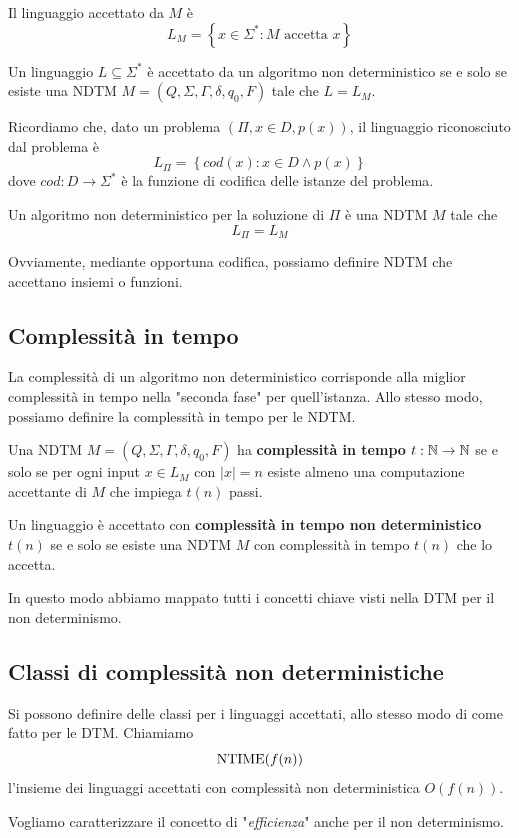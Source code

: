 Il linguaggio accettato da $M$ è 
$$ L_M = \left\{x \in \Sigma^\ast: M \text{ accetta } x\right\} $$

Un linguaggio $L \subseteq \Sigma^\ast$ è accettato da un algoritmo non deterministico se e solo se esiste una NDTM $M = (Q, \Sigma, \Gamma, \delta, q_0, F)$ tale che $L = L_M$.

Ricordiamo che, dato un problema $(\Pi, x \in D, p(x))$, il linguaggio riconosciuto dal problema è
$$ L_\Pi = \left\{cod(x): x \in D \wedge p(x) \right\} $$
dove $cod: D \rightarrow \Sigma^\ast$ è la funzione di codifica delle istanze del problema.

Un algoritmo non deterministico per la soluzione di $\Pi$ è una NDTM $M$ tale che
$$ L_\Pi = L_M $$

Ovviamente, mediante opportuna codifica, possiamo definire NDTM che accettano insiemi o funzioni.

\subsection{Complessità in tempo}

La complessità di un algoritmo non deterministico corrisponde alla miglior complessità in tempo nella "seconda fase" per quell'istanza. Allo stesso modo, possiamo definire la complessità in tempo per le NDTM.

Una NDTM $M = (Q, \Sigma, \Gamma, \delta, q_0, F)$ ha \textbf{complessità in tempo} $t: \mathbb{N} \rightarrow \mathbb{N}$ se e solo se per ogni input $x \in L_M$ con $|x| = n$ esiste almeno una computazione accettante di $M$ che impiega $t(n)$ passi.

Un linguaggio è accettato con \textbf{complessità in tempo non deterministico} $t(n)$ se e solo se esiste una NDTM $M$ con complessità in tempo $t(n)$ che lo accetta.

In questo modo abbiamo mappato tutti i concetti chiave visti nella DTM per il non determinismo.

\subsection{Classi di complessità non deterministiche}

Si possono definire delle classi per i linguaggi accettati, allo stesso modo di come fatto per le DTM. Chiamiamo
$$ \text{NTIME} (f(n)) $$
l'insieme dei linguaggi accettati con complessità non deterministica $O(f(n))$.

Vogliamo caratterizzare il concetto di "\textit{efficienza}" anche per il non determinismo.

